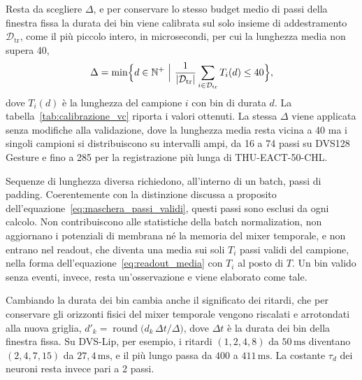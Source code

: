 Resta da scegliere $\Delta$, e per conservare lo stesso budget medio di passi della finestra fissa la durata dei bin viene calibrata sul solo insieme di addestramento $\mathcal D_{\mathrm{tr}}$, come il più piccolo intero, in microsecondi, per cui la lunghezza media non supera 40,
\begin{equation}
\label{eq:calibrazione_delta}
\Delta=\min\Bigl\{d\in\mathbb N^{+}\ \Big|\ \frac{1}{|\mathcal D_{\mathrm{tr}}|}\sum_{i\in\mathcal D_{\mathrm{tr}}}T_i(d)\leq40\Bigr\},
\end{equation}
dove $T_i(d)$ è la lunghezza del campione $i$ con bin di durata $d$. La tabella~\ref{tab:calibrazione_vc} riporta i valori ottenuti. La stessa $\Delta$ viene applicata senza modifiche alla validazione, dove la lunghezza media resta vicina a 40 ma i singoli campioni si distribuiscono su intervalli ampi, da 16 a 74 passi su DVS128 Gesture e fino a 285 per la registrazione più lunga di THU-EACT-50-CHL.

Sequenze di lunghezza diversa richiedono, all'interno di un batch, passi di padding. Coerentemente con la distinzione discussa a proposito dell'equazione~\eqref{eq:maschera_passi_validi}, questi passi sono esclusi da ogni calcolo. Non contribuiscono alle statistiche della batch normalization, non aggiornano i potenziali di membrana né la memoria del mixer temporale, e non entrano nel readout, che diventa una media sui soli $T_i$ passi validi del campione, nella forma dell'equazione~\eqref{eq:readout_media} con $T_i$ al posto di $T$. Un bin valido senza eventi, invece, resta un'osservazione e viene elaborato come tale.

Cambiando la durata dei bin cambia anche il significato dei ritardi, che per conservare gli orizzonti fisici del mixer temporale vengono riscalati e arrotondati alla nuova griglia, $d'_k=\operatorname{round}\bigl(d_k\,\Delta t/\Delta\bigr)$, dove $\Delta t$ è la durata dei bin della finestra fissa. Su DVS-Lip, per esempio, i ritardi $(1,2,4,8)$ da $50\,\mathrm{ms}$ diventano $(2,4,7,15)$ da $27{,}4\,\mathrm{ms}$, e il più lungo passa da $400$ a $411\,\mathrm{ms}$. La costante $\tau_d$ dei neuroni resta invece pari a 2 passi.


